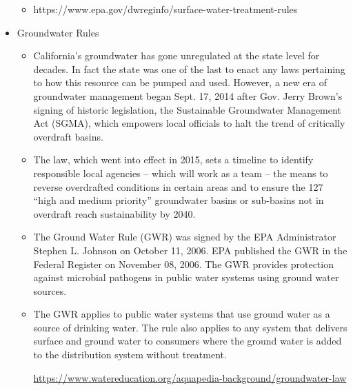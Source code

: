 \begin{itemize}
\begin{itemize}
\item https://www.epa.gov/dwreginfo/surface-water-treatment-rules
\end{itemize}


\item Groundwater Rules
\begin{itemize}
\item California’s groundwater has gone unregulated at the state level for decades. In fact the state was one of the last to enact any laws pertaining to how this resource can be pumped and used. However, a new era of groundwater management began Sept. 17, 2014 after Gov. Jerry Brown’s signing of historic legislation, the Sustainable Groundwater Management Act (SGMA), which empowers local officials to halt the trend of critically overdraft basins.\\

\item The law, which went into effect in 2015, sets a timeline to identify responsible local agencies – which will work as a team – the means to reverse overdrafted conditions in certain areas and to ensure the 127 “high and medium priority” groundwater basins or sub-basins not in overdraft reach sustainability by 2040.\\

\item The Ground Water Rule (GWR) was signed by the EPA Administrator Stephen L. Johnson on October 11, 2006. EPA published the GWR in the Federal Register on November 08, 2006.  The GWR provides protection against microbial pathogens in public water systems using ground water sources.

\item The GWR applies to public water systems that use ground water as a source of drinking water. The rule also applies to any system that delivers surface and ground water to consumers where the ground water is added to the distribution system without treatment. 

\url{https://www.watereducation.org/aquapedia-background/groundwater-law}


\end{itemize}
\end{itemize}
